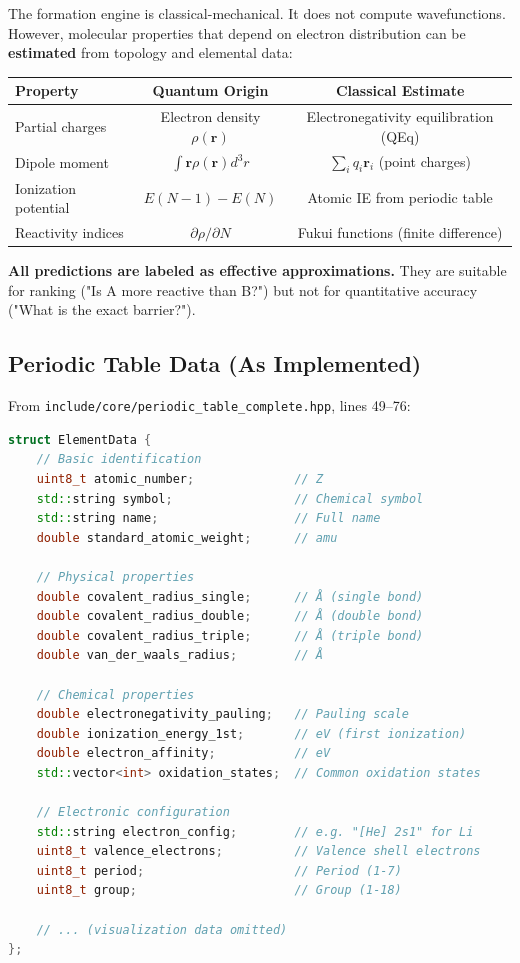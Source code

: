 \documentclass[11pt]{article}
\begin{document}
The formation engine is classical-mechanical. It does not compute wavefunctions. However, molecular properties that depend on electron distribution can be \textbf{estimated} from topology and elemental data:

\begin{center}
\begin{tabular}{lcc}
\toprule
Property & Quantum Origin & Classical Estimate \\
\midrule
Partial charges & Electron density $\rho(\mathbf{r})$ & Electronegativity equilibration (QEq) \\
Dipole moment & $\int \mathbf{r}\rho(\mathbf{r})d^3r$ & $\sum_i q_i \mathbf{r}_i$ (point charges) \\
Ionization potential & $E(N-1) - E(N)$ & Atomic IE from periodic table \\
Reactivity indices & $\partial \rho/\partial N$ & Fukui functions (finite difference) \\
\bottomrule
\end{tabular}
\end{center}

\textbf{All predictions are labeled as effective approximations.} They are suitable for ranking ("Is A more reactive than B?") but not for quantitative accuracy ("What is the exact barrier?").

\subsection{Periodic Table Data (As Implemented)}

From \texttt{include/core/periodic\_table\_complete.hpp}, lines 49--76:

\begin{lstlisting}[language=C++]
struct ElementData {
    // Basic identification
    uint8_t atomic_number;              // Z
    std::string symbol;                 // Chemical symbol
    std::string name;                   // Full name
    double standard_atomic_weight;      // amu
    
    // Physical properties
    double covalent_radius_single;      // Å (single bond)
    double covalent_radius_double;      // Å (double bond)
    double covalent_radius_triple;      // Å (triple bond)
    double van_der_waals_radius;        // Å
    
    // Chemical properties
    double electronegativity_pauling;   // Pauling scale
    double ionization_energy_1st;       // eV (first ionization)
    double electron_affinity;           // eV
    std::vector<int> oxidation_states;  // Common oxidation states
    
    // Electronic configuration
    std::string electron_config;        // e.g. "[He] 2s1" for Li
    uint8_t valence_electrons;          // Valence shell electrons
    uint8_t period;                     // Period (1-7)
    uint8_t group;                      // Group (1-18)
    
    // ... (visualization data omitted)
};
\end{lstlisting}
\end{document}
